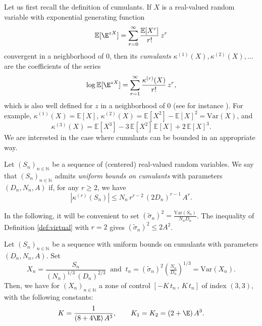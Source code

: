 \documentclass[envcountsame]{svmult}
\newcommand{\N}{\mathbb{N}}
\newcommand{\esper}{\mathbb{E}}
\newcommand{\var}{\mathrm{Var}}
\begin{document}
Let us first recall the definition of cumulants.
If $X$ is a real-valued random variable with exponential generating function
$$\esper[\E^{zX}] = \sum_{r=0}^\infty \frac{\esper[X^r]}{r!}\,z^r $$
convergent in a neighborhood of $0$, then its \emph{cumulants} $\kappa^{(1)}(X),\kappa^{(2)}(X),\ldots$ are the coefficients of the series
$$ \log \esper[\E^{zX}] = \sum_{r=1}^\infty \frac{\kappa^{(r)}(X)}{r!}\,z^r,$$
which is also well defined for $z$ in a neighborhood of $0$ (see for instance \cite{LS59}). For example, $\kappa^{(1)}(X)=\esper[X]$, $\kappa^{(2)}(X)=\esper[X^2]-\esper[X]^2=\var(X)$, and 
$$\kappa^{(3)}(X)=\esper[X^3]-3\,\esper[X^2]\,\esper[X] + 2\,\esper[X]^3 .$$
We are interested in the case where cumulants can be bounded in an appropriate way.
\begin{definition}\label{def:virtual}
Let $(S_n)_{n \in \N}$ be a sequence of (centered) real-valued random variables.
We say that $(S_n)_{n \in \N}$ admits \emph{uniform bounds on cumulants} with parameters $(D_n,N_n,A)$ if,
for any $r\geq 2$, we have
$$|\kappa^{(r)}(S_n)| \leq N_n\,r^{r-2}\,(2D_n)^{r-1}\,A^r.$$
\end{definition}
\noindent 
In the following, it will be convenient to set
$(\widetilde{\sigma}_n)^2 = \frac{\var(S_n)}{N_n D_n}$. The inequality of Definition \ref{def:virtual} with $r = 2$ gives $(\widetilde{\sigma}_n)^2 \leq 2A^2$.

\begin{lemma}
  Let $(S_n)_{n \in \N}$ be a sequence with uniform bounds on cumulants with parameters $(D_n,N_n,A)$.
  Set \[X_n = \frac{S_n}{( N_n)^{1/3}\,(D_n)^{2/3}} 
  \ \text{ and }\ t_n=(\widetilde{\sigma}_n)^2 (\tfrac{N_n}{D_n})^{1/3}=\var(X_n).\]
  Then, we have for $(X_n)_{n \in \N}$ a zone of control $ [-K\,t_n\,,\,K\,t_n]$ of index $(3,3)$, 
  with the following constants:
  \[K=\frac{1}{(8+4\E)\,A^3}, \qquad K_1 = K_2 = (2+\E)\,A^3.\]
  \label{lem:Cumulants_Zone}
\end{lemma}
\end{document}
